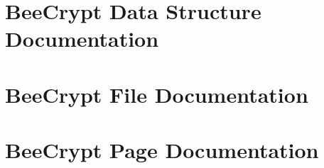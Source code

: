 \documentclass[a4paper]{book}
\begin{document}
\chapter{Bee\-Crypt Data Structure Documentation}































\chapter{Bee\-Crypt File Documentation}











































\chapter{Bee\-Crypt Page Documentation}

\printindex
\end{document}
